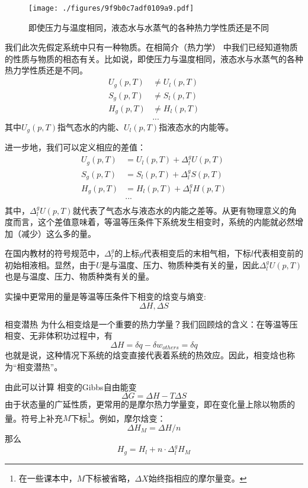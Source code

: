 
\begin{issues}
\issueDraft
{}
\end{issues}


\begin{figure}[ht]
\centering
\texttt{[image: ./figures/9f9b0c7adf0109a9.pdf]}
\caption{即使压力与温度相同，液态水与水蒸气的各种热力学性质还是不同} \label{fig_PTTVC2_1}
\end{figure}

我们此次先假定系统中只有一种物质。在相简介（热力学） 中我们已经知道物质的性质与物质的相态有关。比如说，即使压力与温度相同，液态水与水蒸气的各种热力学性质还是不同。
$$
\begin{aligned}
U_g(p,T) &\ne U_l(p,T)\\
S_g(p,T) &\ne S_l(p,T)\\
H_g(p,T) &\ne H_l(p,T)\\
&...
\end{aligned}
$$
其中$U_g(p,T)$指气态水的内能、$U_l(p,T)$指液态水的内能等。

进一步地，我们可以定义相应的差值：
$$
\begin{aligned}
U_g(p,T) &= U_l(p,T) + \Delta ^ g_l U (p,T)\\
S_g(p,T) &= S_l(p,T) + \Delta ^ g_l S (p,T)\\
H_g(p,T) &= H_l(p,T) + \Delta ^ g_l H (p,T)\\
&...\\
\end{aligned}
$$
其中，$\Delta ^ g_l U (p,T)$就代表了气态水与液态水的内能之差等。从更有物理意义的角度而言，这个差值意味着，等温等压条件下系统发生相变时，系统的内能就必然增加（减少）这么多的量。

在国内教材的符号规范中，$\Delta^g_l$的上标$g$代表相变后的末相气相，下标$l$代表相变前的初始相液相。显然，由于$U$是与温度、压力、物质种类有关的量，因此$\Delta ^ g_l U (p,T)$也是与温度、压力、物质种类有关的量。



实操中更常用的量是等温等压条件下相变的焓变与熵变:
$$
\Delta H, \Delta  S
$$

\begin{example}{相变潜热}
为什么相变焓是一个重要的热力学量？我们回顾焓的含义：在等温等压相变、无非体积功过程中，有
$$
\Delta H = \delta q - \delta w_{others} = \delta q
$$
也就是说，这种情况下系统的焓变直接代表着系统的热效应。因此，相变焓也称为“相变潜热”。
\end{example}

由此可以计算 相变的Gibbs自由能变
$$
\Delta G = \Delta H - T \Delta S
$$
由于状态量的广延性质，更常用的是摩尔热力学量变，即在变化量上除以物质的量。符号上补充$M$下标\footnote{在一些课本中，$M$下标被省略，$\Delta X$始终指相应的摩尔量变。}。例如，摩尔焓变：
$$
\Delta H_M = \Delta H / n
$$
那么
$$
H_g = H_l + n \cdot \Delta^g_l H_M
$$
